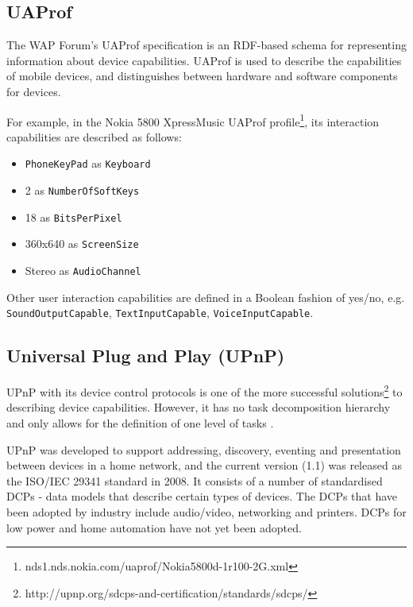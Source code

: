 \subsection{UAProf}

The WAP Forum's \ac{UAProf} specification is an \ac{RDF}-based schema for representing information about device capabilities. UAProf is used to describe the capabilities of mobile devices, and distinguishes between hardware and software components for devices.


For example, in the Nokia 5800 XpressMusic UAProf profile\footnote{nds1.nds.nokia.com/uaprof/Nokia5800d-1r100-2G.xml
}, its interaction capabilities are described as follows:

\begin{itemize}
	\item \texttt{PhoneKeyPad} as \texttt{Keyboard}
	\item 2 as \texttt{NumberOfSoftKeys}
	\item 18 as \texttt{BitsPerPixel}
	\item 360x640 as \texttt{ScreenSize}
	\item Stereo as \texttt{AudioChannel}
\end{itemize}

Other user interaction capabilities are defined in a Boolean fashion of yes/no, e.g. \texttt{SoundOutputCapable}, \texttt{TextInputCapable}, \texttt{VoiceInputCapable}.

\subsection{Universal Plug and Play (UPnP)}
\label{UPnP}

\ac{UPnP} with its device control protocols is one of the more successful solutions\footnote{http://upnp.org/sdcps-and-certification/standards/sdcps/} to describing device capabilities. However, it has no task decomposition hierarchy and only allows for the definition of one level of tasks \cite{Niezen2010}.

\ac{UPnP} was developed to support addressing, discovery, eventing and presentation between devices in a home network, and the current version (1.1) was released as the ISO/IEC 29341 standard in 2008. It consists of a number of standardised \acp{DCP} - data models that describe certain types of devices. The \acp{DCP} that have been adopted by industry include audio/video, networking and printers. \acp{DCP} for low power and home automation have not yet been adopted.

